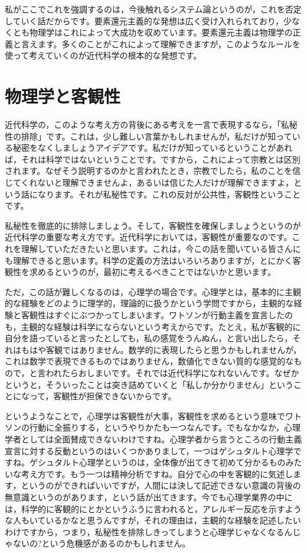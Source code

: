\documentclass{ltjsbook}
\begin{document}
私がここでこれを強調するのは，今後触れるシステム論というのが，これを否定していく話だからです。要素還元主義的な発想は広く受け入れられており，少なくとも物理学はこれによって大成功を収めています。要素還元主義は物理学の正義と言えます。多くのことがこれによって理解できますが，このようなルールを使って考えていくのが近代科学の根本的な発想です。

\section{物理学と客観性}
近代科学の，このような考え方の背後にある考えを一言で表現するなら，「私秘性の排除」です。これは，少し難しい言葉かもしれませんが，私だけが知っている秘密をなくしましょうアイデアです。私だけが知っているということがあれば，それは科学ではないということです。ですから，これによって宗教とは区別されます。なぜそう説明するのかと言われたとき，宗教でしたら，私のことを信じてくれないと理解できませんよ，あるいは信じた人だけが理解できますよ，という話になります。それが私秘性です。これの反対が公共性，客観性ということです。

私秘性を徹底的に排除しましょう。そして，客観性を確保しましょうというのが近代科学の重要な考え方です。近代科学においては，客観性が重要なのです。これを理解していただきたいと思います。これは，今この話を聞いている皆さんにも理解できると思います。科学の定義の方法はいろいろありますが，とにかく客観性を求めるというのが，最初に考えるべきことではないかと思います。

ただ，この話が難しくなるのは，心理学の場合です。心理学とは，基本的に主観的な経験をどのように理学的，理論的に扱うかという学問ですから，主観的な経験と客観性はすぐにぶつかってしまいます。ワトソンが行動主義を宣言したのも，主観的な経験は科学にならないという考えからです。たとえ，私が客観的に自分を語っていると言ったとしても，私の感覚をうんぬん，と言い出したら，それはもはや客観ではありません。数学的に表現したらと思うかもしれませんが，これは数学で表現できるものではありません，数値化できない質的な感覚的なもので，と言われたらおしまいです。それでは近代科学になれないんです。なぜかというと，そういったことは突き詰めていくと「私しか分かりません」ということになって，客観性が担保できないからです。

というようなことで，心理学は客観性が大事，客観性を求めるという意味でワトソンの行動に全振りする，というやりかたも一つなんです。でもなかなか，心理学者としては全面賛成できないわけですね。心理学者から言うところの行動主義宣言に対する反動というのはいくつかありまして，一つはゲシュタルト心理学ですね。ゲシュタルト心理学というのは，全体像が出てきて初めて分かるものみたいな考え方です。もう一つは精神分析ですね。自分で心の中を客観的に気述します，というのができればいいですが，人間には決して記述できない意識の背後の無意識というのがあります，という話が出てきます。今でも心理学業界の中には，科学的に客観的にとかというふうに言われると，アレルギー反応を示すような人もいているかなと思うんですが，それの理由は，主観的な経験を記述したいわけですから，つまり，私秘性を排除しきってしまうと心理学じゃなくなるんじゃないの?という危機感があるのかもしれません。
\end{document}
